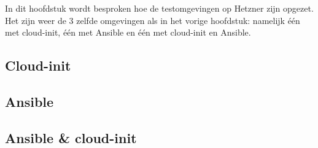 \chapter{}
\label{ch:testhetzner}
In dit hoofdstuk wordt besproken hoe de testomgevingen op Hetzner zijn opgezet. Het zijn weer de 3 zelfde omgevingen als in het vorige hoofdstuk: namelijk één met cloud-init, één met Ansible en één met cloud-init en Ansible.

\section{Cloud-init}

\section{Ansible}

\section{Ansible \& cloud-init}